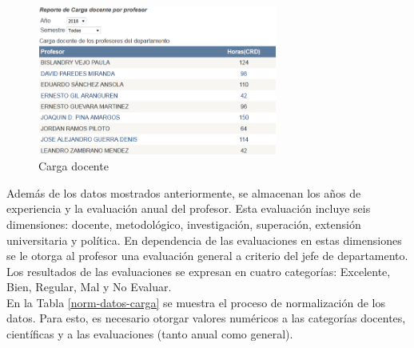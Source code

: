 \begin{figure} [H]
	\centering
	\includegraphics[width=0.7\textwidth]{figuras/HorasProfesor.png}
	\caption{Carga docente} \label{horas-prof}
\end{figure}

Además de los datos mostrados anteriormente, se almacenan los años de experiencia y la evaluación anual del profesor. Esta evaluación incluye seis dimensiones: docente, metodológico, investigación, superación, extensión universitaria y política. En dependencia de las evaluaciones en estas dimensiones se le otorga al profesor una evaluación general a criterio del jefe de departamento. Los resultados de las evaluaciones se expresan en cuatro categorías: Excelente, Bien, Regular, Mal y No Evaluar. \\

En la Tabla \ref{norm-datos-carga} se muestra el proceso de normalización de los datos. Para esto, es necesario otorgar valores numéricos a las categorías docentes, científicas y a las evaluaciones (tanto anual como general). 

